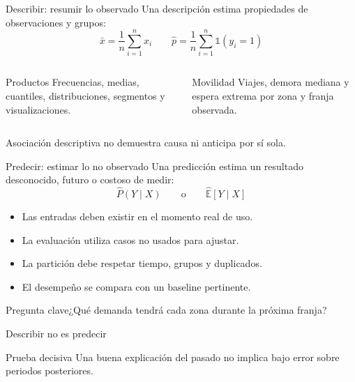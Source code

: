 \documentclass[aspectratio=169,11pt]{beamer}
\newcommand{\pregunta}[1]{\begin{block}{Pregunta clave}#1\end{block}}
\newcommand{\br}{\\}
\begin{document}
\begin{frame}{Describir: resumir lo observado}
  Una descripción estima propiedades de observaciones y grupos:
  \[
    \bar{x}=\frac{1}{n}\sum_{i=1}^{n}x_i
    \qquad
    \widehat{p}=\frac{1}{n}\sum_{i=1}^{n}\mathbb{1}(y_i=1)
  \]
  \begin{columns}[T]
      \begin{block}{Productos}
        Frecuencias, medias, cuantiles, distribuciones, segmentos y visualizaciones.
      \end{block}
      \begin{block}{Movilidad}
        Viajes, demora mediana y espera extrema por zona y franja observada.
      \end{block}
  \end{columns}
  \centering\alert{Asociación descriptiva no demuestra causa ni anticipa por sí sola.}
\end{frame}

\begin{frame}{Predecir: estimar lo no observado}
  Una predicción estima un resultado desconocido, futuro o costoso de medir:
  \[
    \widehat{P}(Y\mid X)
    \qquad\text{o}\qquad
    \widehat{\mathbb{E}}[Y\mid X]
  \]
  \begin{itemize}
    \item Las entradas deben existir en el momento real de uso.
    \item La evaluación utiliza casos no usados para ajustar.
    \item La partición debe respetar tiempo, grupos y duplicados.
    \item El desempeño se compara con un baseline pertinente.
  \end{itemize}
  \pregunta{¿Qué demanda tendrá cada zona durante la próxima franja?}
\end{frame}

\begin{frame}{Describir no es predecir}
  \centering
  \vfill
  \begin{block}{Prueba decisiva}
    Una buena explicación del pasado no implica bajo error sobre periodos posteriores.
  \end{block}
\end{frame}
\end{document}
